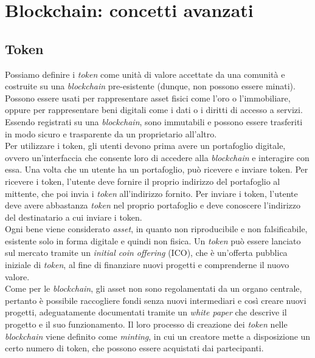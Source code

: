 \section{Blockchain: concetti avanzati}\label{sec:tecnologie-blockchain-avanzate}

\subsection{Token}\label{sec:tecnologie-blockchain-avanzate-token}
Possiamo definire i \textit{token} come unità di valore accettate da una comunità e costruite su una \textit{blockchain} pre-esistente (dunque, non possono essere minati).
Possono essere usati per rappresentare asset fisici come l'oro o l'immobiliare, oppure per rappresentare beni digitali 
come i dati o i diritti di accesso a servizi. Essendo registrati su una \textit{blockchain}, sono immutabili e possono essere trasferiti in modo sicuro e trasparente da un proprietario all'altro. \\

Per utilizzare i token, gli utenti devono prima avere un portafoglio digitale, ovvero un'interfaccia che consente loro 
di accedere alla \textit{blockchain} e interagire con essa. Una volta che un utente ha un portafoglio, 
può ricevere e inviare token. Per ricevere i token, l'utente deve fornire il proprio indirizzo del portafoglio al mittente, 
che poi invia i \textit{token} all'indirizzo fornito. Per inviare i token, l'utente deve avere abbastanza \textit{token} nel proprio portafoglio e deve conoscere l'indirizzo del destinatario a cui inviare i token. \\

Ogni bene viene considerato \textit{asset}, in quanto non riproducibile e non falsificabile, esistente solo in forma digitale e quindi non fisica. 
Un \textit{token} può essere lanciato sul mercato tramite un \textit{initial coin offering} (ICO),
che è un'offerta pubblica iniziale di \textit{token}, al fine di finanziare nuovi progetti e comprenderne il nuovo valore.
\\ 
Come per le \textit{blockchain}, gli asset non sono regolamentati da un organo centrale, pertanto è possibile raccogliere fondi senza nuovi intermediari e così creare
nuovi progetti, adeguatamente documentati tramite un \textit{white paper} che descrive il progetto e il suo funzionamento. 
Il loro processo di creazione dei \textit{token} nelle \textit{blockchain} viene definito come \textit{minting}, in cui un creatore mette a disposizione un certo numero di token,
che possono essere acquistati dai partecipanti. \\

